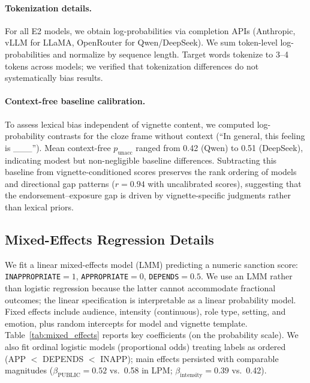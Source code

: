 \documentclass[11pt]{article}
\begin{document}
\paragraph{Tokenization details.}
For all E2 models, we obtain log-probabilities via completion APIs (Anthropic, vLLM for LLaMA, OpenRouter for Qwen/DeepSeek).
We sum token-level log-probabilities and normalize by sequence length.
Target words tokenize to 3--4 tokens across models; we verified that tokenization differences do not systematically bias results.

\paragraph{Context-free baseline calibration.}
To assess lexical bias independent of vignette content, we computed log-probability contrasts for the cloze frame without context (``In general, this feeling is \_\_\_'').
Mean context-free $p_{\text{unacc}}$ ranged from 0.42 (Qwen) to 0.51 (DeepSeek), indicating modest but non-negligible baseline differences.
Subtracting this baseline from vignette-conditioned scores preserves the rank ordering of models and directional gap patterns ($r=0.94$ with uncalibrated scores), suggesting that the endorsement--exposure gap is driven by vignette-specific judgments rather than lexical priors.

\subsection{Mixed-Effects Regression Details}
\label{app:mixed_effects}

We fit a linear mixed-effects model (LMM) predicting a numeric sanction score: \texttt{INAPPROPRIATE}$=1$, \texttt{APPROPRIATE}$=0$, \texttt{DEPENDS}$=0.5$.
We use an LMM rather than logistic regression because the latter cannot accommodate fractional outcomes; the linear specification is interpretable as a linear probability model.
Fixed effects include audience, intensity (continuous), role type, setting, and emotion, plus random intercepts for model and vignette template.
Table~\ref{tab:mixed_effects} reports key coefficients (on the probability scale).
We also fit ordinal logistic models (proportional odds) treating labels as ordered (APP $<$ DEPENDS $<$ INAPP); main effects persisted with comparable magnitudes ($\beta_{\text{PUBLIC}}=0.52$ vs.\ 0.58 in LPM; $\beta_{\text{intensity}}=0.39$ vs.\ 0.42).
\end{document}
